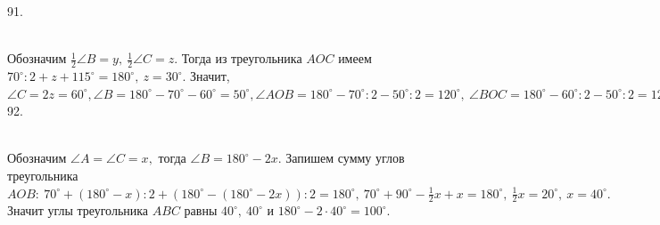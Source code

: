 \documentclass[12pt]{article}
\begin{document}
91. \begin{figure}[ht!]
\end{figure}\\
Обозначим $\frac{1}{2}\angle B=y,\ \frac{1}{2}\angle C=z.$ Тогда из треугольника $AOC$ имеем $70^\circ:2+z+115^\circ=180^\circ,\ z=30^\circ.$ Значит, $\angle C=2z=60^\circ, \angle B=180^\circ-70^\circ-60^\circ=50^\circ, \angle AOB=180^\circ-70^\circ:2-50^\circ:2=120^\circ,\ \angle BOC=180^\circ-60^\circ:2-50^\circ:2=125^\circ.$\\
92. \begin{figure}[ht!]
\end{figure}\\
Обозначим $\angle A=\angle C=x,$ тогда $\angle B=180^\circ-2x.$ Запишем сумму углов треугольника $AOB:\ 70^\circ+(180^\circ-x):2+(180^\circ-(180^\circ-2x)):2=180^\circ,\ 70^\circ +90^\circ-\frac{1}{2}x+x=180^\circ,\ \frac{1}{2}x=20^\circ,\ x=40^\circ.$ Значит углы треугольника $ABC$ равны $40^\circ,\ 40^\circ$ и $180^\circ-2\cdot40^\circ=100^\circ.$\newpage\noindent
\end{document}
